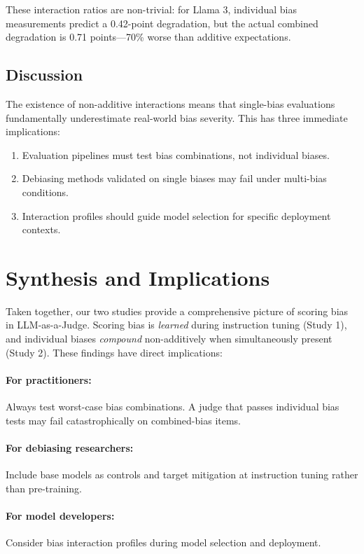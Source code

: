 \documentclass[11pt,twocolumn]{article}
\begin{document}
These interaction ratios are non-trivial: for Llama 3, individual bias measurements predict a 0.42-point degradation, but the actual combined degradation is 0.71 points---70\% worse than additive expectations.

\subsection{Discussion}
The existence of non-additive interactions means that single-bias evaluations fundamentally underestimate real-world bias severity. This has three immediate implications:
\begin{enumerate}
    \item Evaluation pipelines must test bias combinations, not individual biases.
    \item Debiasing methods validated on single biases may fail under multi-bias conditions.
    \item Interaction profiles should guide model selection for specific deployment contexts.
\end{enumerate}

\section{Synthesis and Implications}

Taken together, our two studies provide a comprehensive picture of scoring bias in LLM-as-a-Judge. Scoring bias is \emph{learned} during instruction tuning (Study 1), and individual biases \emph{compound} non-additively when simultaneously present (Study 2). These findings have direct implications:

\paragraph{For practitioners:} Always test worst-case bias combinations. A judge that passes individual bias tests may fail catastrophically on combined-bias items.

\paragraph{For debiasing researchers:} Include base models as controls and target mitigation at instruction tuning rather than pre-training.

\paragraph{For model developers:} Consider bias interaction profiles during model selection and deployment.
\end{document}
